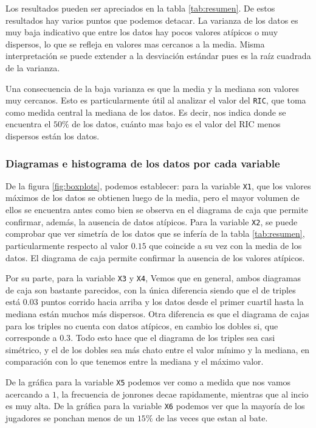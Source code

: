 \documentclass{staprojteamusb}
\begin{document}
 Los resultados pueden ser apreciados en la tabla \ref{tab:resumen}. De estos resultados hay varios puntos que podemos detacar. La varianza de los datos es muy baja indicativo que entre los datos hay pocos valores atípicos o muy dispersos, lo que se refleja en valores mas cercanos a la media. Misma interpretación se puede extender a la desviación estándar pues es la raíz cuadrada de la varianza.

 Una consecuencia de la baja varianza es que la media y la mediana son valores muy cercanos. Esto es particularmente útil al analizar el valor del \texttt{RIC}, que toma como medida central la mediana de los datos. Es decir, nos indica donde se encuentra el \(50\%\) de los datos, cuánto mas bajo es el valor del RIC menos dispersos están los datos.

 \hypertarget{diagramas-e-histograma-de-los-datos-por-cada-variable}{%
 \subsubsection{Diagramas e histograma de los datos por cada variable}\label{diagramas-e-histograma-de-los-datos-por-cada-variable}}

 De la figura \ref{fig:boxplots}, podemos establecer: para la variable \texttt{X1}, que los valores máximos de los datos se obtienen luego de la media, pero el mayor volumen de ellos se encuentra antes como bien se observa en el diagrama de caja que permite confirmar, además, la ausencia de datos atípicos. Para la variable \texttt{X2}, se puede comprobar que ver simetría de los datos que se infería de la tabla \ref{tab:resumen}, particularmente respecto al valor \(0.15\) que coincide a su vez con la media de los datos. El diagrama de caja permite confirmar la ausencia de los valores atípicos.

 Por su parte, para la variable \texttt{X3} y \texttt{X4}, Vemos que en general, ambos diagramas de caja son bastante parecidos, con la única diferencia siendo que el de triples está \(0.03\) puntos corrido hacia arriba y los datos desde el primer cuartil hasta la mediana están muchos más dispersos. Otra diferencia es que el diagrama de cajas para los triples no cuenta con datos atípicos, en cambio los dobles si, que corresponde a \(0.3\). Todo esto hace que el diagrama de los triples sea casi simétrico, y el de los dobles sea más chato entre el valor mínimo y la mediana, en comparación con lo que tenemos entre la mediana y el máximo valor.

 De la gráfica para la variable \texttt{X5} podemos ver como a medida que nos vamos acercando a \(1\), la frecuencia de jonrones decae rapidamente, mientras que al incio es muy alta. De la gráfica para la variable \texttt{X6} podemos ver que la mayoría de los jugadores se ponchan menos de un \(15\%\) de las veces que estan al bate.
\end{document}
